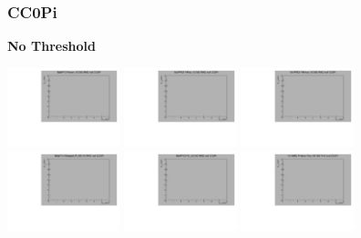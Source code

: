 \subsubsection{CC0Pi}

\textbf{No Threshold}

\begin{center}

  \includegraphics[width=0.245\textwidth]{plots/response_matrix/Proton_KE_RHC_CC0Pi_null.pdf}
  \includegraphics[width=0.245\textwidth]{plots/response_matrix/PiPlus_KE_RHC_CC0Pi_null.pdf}
  \includegraphics[width=0.245\textwidth]{plots/response_matrix/PiMinus_KE_RHC_CC0Pi_null.pdf}
  \includegraphics[width=0.245\textwidth]{plots/response_matrix/Charged_Pi_KE_RHC_CC0Pi_null.pdf}
  \includegraphics[width=0.245\textwidth]{plots/response_matrix/Pi0_KE_RHC_CC0Pi_null.pdf}
  \includegraphics[width=0.245\textwidth]{plots/response_matrix/Proton+Pion_KE_RHC_CC0Pi_null.pdf}

\end{center}
